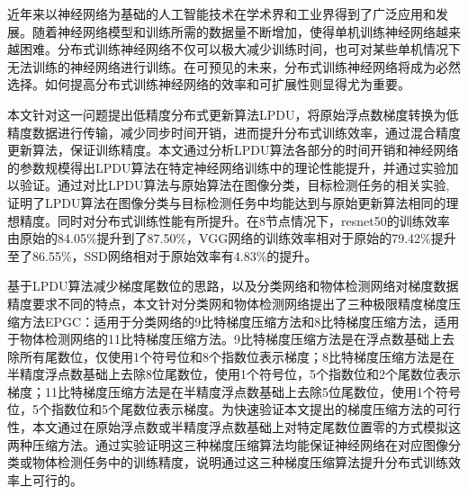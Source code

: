 \begin{cabstract}
近年来以神经网络为基础的人工智能技术在学术界和工业界得到了广泛应用和发展。随着神经网络模型和训练所需的数据量不断增加，使得单机训练神经网络越来越困难。分布式训练神经网络不仅可以极大减少训练时间，也可对某些单机情况下无法训练的神经网络进行训练。在可预见的未来，分布式训练神经网络将成为必然选择。如何提高分布式训练神经网络的效率和可扩展性则显得尤为重要。

本文针对这一问题提出低精度分布式更新算法LPDU，将原始浮点数梯度转换为低精度数据进行传输，减少同步时间开销，进而提升分布式训练效率，通过混合精度更新算法，保证训练精度。本文通过分析LPDU算法各部分的时间开销和神经网络的参数规模得出LPDU算法在特定神经网络训练中的理论性能提升，并通过实验加以验证。通过对比LPDU算法与原始算法在图像分类，目标检测任务的相关实验,证明了LPDU算法在图像分类与目标检测任务中均能达到与原始更新算法相同的理想精度。同时对分布式训练性能有所提升。在8节点情况下，resnet50的训练效率由原始的84.05\%提升到了87.50\%，VGG网络的训练效率相对于原始的79.42\%提升至了86.55\%，SSD网络相对于原始效率有4.83\%的提升。

基于LPDU算法减少梯度尾数位的思路，以及分类网络和物体检测网络对梯度数据精度要求不同的特点，本文针对分类网和物体检测网络提出了三种极限精度梯度压缩方法EPGC：适用于分类网络的9比特梯度压缩方法和8比特梯度压缩方法，适用于物体检测网络的11比特梯度压缩方法。9比特梯度压缩方法是在浮点数基础上去除所有尾数位，仅使用1个符号位和8个指数位表示梯度；8比特梯度压缩方法是在半精度浮点数基础上去除8位尾数位，使用1个符号位，5个指数位和2个尾数位表示梯度；11比特梯度压缩方法是在半精度浮点数基础上去除5位尾数位，使用1个符号位，5个指数位和5个尾数位表示梯度。为快速验证本文提出的梯度压缩方法的可行性，本文通过在原始浮点数或半精度浮点数基础上对特定尾数位置零的方式模拟这两种压缩方法。通过实验证明这三种梯度压缩算法均能保证神经网络在对应图像分类或物体检测任务中的训练精度，说明通过这三种梯度压缩算法提升分布式训练效率上可行的。

\end{cabstract}

